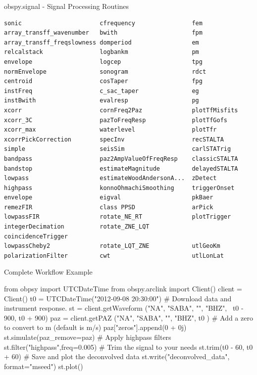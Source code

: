 \documentclass[handout]{beamer}
\begin{document}
\begin{frame}{}
    \begin{center}
        \textcolor{lmu@darkgreen}{\LARGE{obspy.signal - Signal Processing Routines}}
    \end{center}
\end{frame}


\begin{frame}{}

\footnotesize
\begin{verbatim}
sonic                      cfrequency                fem
array_transff_wavenumber   bwith                     fpm
array_transff_freqslowness domperiod                 em
relcalstack                logbankm                  pm
envelope                   logcep                    tpg
normEnvelope               sonogram                  rdct
centroid                   cosTaper                  fpg
instFreq                   c_sac_taper               eg
instBwith                  evalresp                  pg
xcorr                      cornFreq2Paz              plotTfMisfits
xcorr_3C                   pazToFreqResp             plotTfGofs
xcorr_max                  waterlevel                plotTfr
xcorrPickCorrection        specInv                   recSTALTA
simple                     seisSim                   carlSTATrig
bandpass                   paz2AmpValueOfFreqResp    classicSTALTA
bandstop                   estimateMagnitude         delayedSTALTA
lowpass                    estimateWoodAndersonA...  zDetect
highpass                   konnoOhmachiSmoothing     triggerOnset
envelope                   eigval                    pkBaer
remezFIR                   class PPSD                arPick
lowpassFIR                 rotate_NE_RT              plotTrigger
integerDecimation          rotate_ZNE_LQT            coincidenceTrigger
lowpassCheby2              rotate_LQT_ZNE            utlGeoKm
polarizationFilter         cwt                       utlLonLat
\end{verbatim}
\end{frame}


\begin{frame}{Complete Workflow Example}
\begin{myColorBox}{0.95}{}
\begin{python}
from obpsy import UTCDateTime
from obspy.arclink import Client()
client = Client()
t0 = UTCDateTime("2012-09-08 20:30:00")
# Download data and instrument response.
st = client.getWaveform ("NA", "SABA", "", "BHZ", \
    t0 - 900, t0 + 900)
paz = client.getPAZ ("NA", "SABA", "", "BHZ", t0 )
# Add a zero to convert to m (default is m/s)
paz["zeros"].append(0 + 0j)
st.simulate(paz_remove=paz)
# Apply highpass filters
st.filter("highpass",freq=0.005)
# Trim the signal to your needs
st.trim(t0 - 60, t0 + 60)
# Save and plot the deconvolved data
st.write("deconvolved_data", format="mseed")
st.plot()
\end{python}
\end{myColorBox}
\end{frame}
\end{document}
